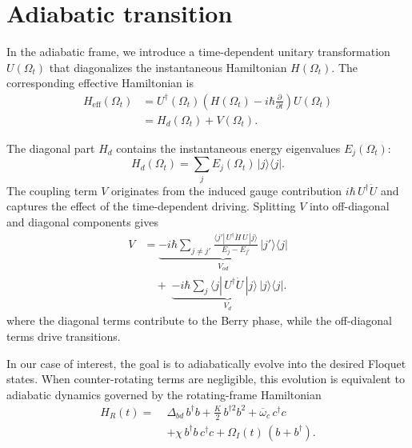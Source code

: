 \section{Adiabatic transition}
\label{Adiabatic transition}
In the adiabatic frame, we introduce a time-dependent unitary transformation \(U(\Omega_t)\) that diagonalizes the instantaneous Hamiltonian \(H(\Omega_t)\). The corresponding effective Hamiltonian is
\begin{equation}
\begin{aligned}
H_{\mathrm{eff}}(\Omega_t)
&= U^\dagger(\Omega_t)\!\left( H(\Omega_t) - i\hbar \frac{\partial}{\partial t} \right)\!U(\Omega_t) \\
&= H_d(\Omega_t) + V(\Omega_t).
\end{aligned}
\end{equation}

The diagonal part \(H_d\) contains the instantaneous energy eigenvalues \(E_j(\Omega_t)\):
\begin{equation}
H_d(\Omega_t)=\sum_j E_j(\Omega_t)\,|j\rangle\langle j|.
\end{equation}
The coupling term \(V\) originates from the induced gauge contribution \(i\hbar\,U^\dagger \dot U\) and captures the effect of the time-dependent driving. Splitting \(V\) into off-diagonal and diagonal components gives
\begin{equation}
\begin{aligned}
V
&=
\underbrace{-i\hbar \sum_{j\neq j'} 
\frac{\langle j'|\,U^\dagger \dot H\,U\,|j\rangle}{E_j-E_{j'}}\,|j'\rangle\langle j|}_{V_{od}}
\\
&\quad+\;
\underbrace{-i\hbar \sum_j \langle j|\,U^\dagger \dot U\,|j\rangle\,|j\rangle\langle j|}_{V_d}.
\end{aligned}
\end{equation}
where the diagonal terms contribute to the Berry phase, while the off-diagonal terms drive transitions.

In our case of interest, the goal is to adiabatically evolve into the desired Floquet states. When counter-rotating terms are negligible, this evolution is equivalent to adiabatic dynamics governed by the rotating-frame Hamiltonian
\begin{equation}
\begin{aligned}
H_R(t) =\;&
\Delta_{bd}\, b^\dagger b
+ \frac{K}{2}\, b^{\dagger 2} b^{2}
+ \overline{\omega}_c\, c^\dagger c \\
&+ \chi\, b^\dagger b\, c^\dagger c
+ \Omega_I(t)\, ( b + b^\dagger ) .
\end{aligned}
\end{equation}

